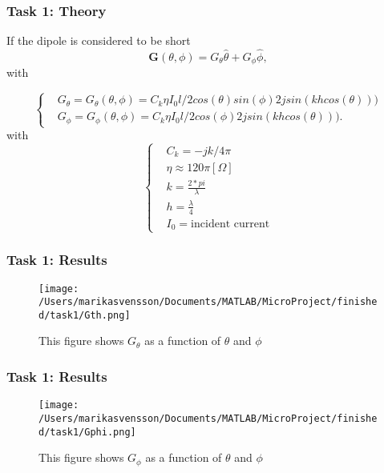\begin{frame}
\frametitle{Task 1: Theory}
If the dipole is considered to be short
\begin{equation}
\mathbf{G}(\theta, \phi) = G_{\theta}\hat{\theta} + G_{\phi}\hat{\phi},
\end{equation}
with

\begin{equation}
\begin{cases}
&G_{\theta} = G_{\theta}(\theta, \phi) = C_k\eta I_0 l/2cos(\theta)sin(\phi)2jsin(khcos(\theta))) \\
& G_{\phi} = G_{\phi}(\theta, \phi) = C_k\eta I_0 l/2cos(\phi)2jsin(khcos(\theta))).
\end{cases}
\end{equation} 
with 
\begin{equation}
\begin{cases}
& C_k = -jk/4\pi \\
& \eta \approx 120 \pi [\Omega] \\
& k = \frac{2*pi}{\lambda} \\
& h = \frac{\lambda}{4}\\
& I_0 = \text{incident current}
 \end{cases}
\end{equation}


\end{frame}

\begin{frame}
\frametitle{Task 1: Results}
\begin{figure}[h]
\centering
\texttt{[image: /Users/marikasvensson/Documents/MATLAB/MicroProject/finished/task1/Gth.png]}
\caption{This figure shows $G_\theta$ as a function of $\theta$ and $\phi$}
\label{task1:Gth}
\end{figure}

\end{frame}

\begin{frame}
\frametitle{Task 1: Results}
\begin{figure}[h]
\centering
\texttt{[image: /Users/marikasvensson/Documents/MATLAB/MicroProject/finished/task1/Gphi.png]}
\caption{This figure shows $G_\phi$ as a function of $\theta$ and $\phi$}
\label{task1:Gphi}
\end{figure}
\end{frame}